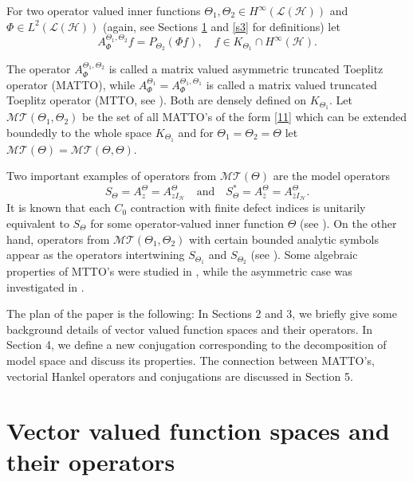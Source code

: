 \documentclass[12pt]{amsart}
\numberwithin{equation}{section}
\newcommand{\hsp}{\mathcal{H}}
\newcommand{\oL }{\mathcal{L}(\hsp) }
\theoremstyle{definition}
\numberwithin{equation}{section}
\begin{document}
For two operator valued inner functions $\Theta_1,\Theta_2\in H^{\infty}(\oL)$ and $\Phi\in L^2(\oL )$ (again, see Sections \ref{s2} and \ref{s3} for definitions) let
\begin{equation}\label{11}
A_{\Phi}^{\Theta_{1}, \Theta_{2}}f=P_{\Theta_{2}}(\Phi f),\quad f\in K_{\Theta_{1}}\cap H^{\infty}(\hsp ).
\end{equation}

 The operator $A_{\Phi}^{\Theta_{1}, \Theta_{2}}$ is called a matrix valued asymmetric truncated Toeplitz operator (MATTO), while $A_{\Phi}^{\Theta_{1}}=A_{\Phi}^{\Theta_{1}, \Theta_{1}}$ is called a matrix valued truncated Toeplitz operator (MTTO, see \cite{KT}). Both are densely defined on $K_{\Theta_{1}}$. Let $\mathcal{MT}(\Theta_{1},\Theta_{2})$ be the set of all MATTO's of the form \eqref{11} which can be extended boundedly to the whole space $K_{\Theta_{1}}$ and for $\Theta_{1}=\Theta_{2}=\Theta$ let $\mathcal{MT}(\Theta )=\mathcal{MT}(\Theta,\Theta)$.

 Two important examples of operators from $\mathcal{MT}(\Theta )$ are the model operators
\begin{equation}\label{modl}
S_{\Theta}=A_{z }^{\Theta }=A_{zI_{\hsp}}^{\Theta }\quad\text{and}\quad S_{\Theta }^*=A_{\bar z }^{\Theta }=A_{\bar zI_{\hsp}}^{\Theta  }.
\end{equation} It is known that each $C_0$ contraction with finite defect indices is unitarily equivalent to $S_{\Theta}$ for some operator-valued inner function $\Theta$ (see \cite[Chapter IV]{NF}). On the other hand, operators from $\mathcal{MT}(\Theta_{1},\Theta_{2})$ with certain bounded analytic symbols appear as the operators intertwining $S_{\Theta_{1}}$ and $S_{\Theta_{2}}$ (see \cite[p. 238]{berc}).
 Some algebraic properties of MTTO's were studied in \cite{KT}, while the asymmetric case was investigated in \cite{RK2}.

 \medskip
The plan of the paper is the following:
 In Sections 2 and 3, we briefly give some background details of vector valued function spaces and their operators. In Section 4, we define a new conjugation corresponding to the decomposition of model space and discuss its properties. The connection between MATTO's, vectorial Hankel operators and conjugations are discussed in Section 5.


\section{\bf{Vector valued function spaces and their operators}}\label{s2}
\end{document}
